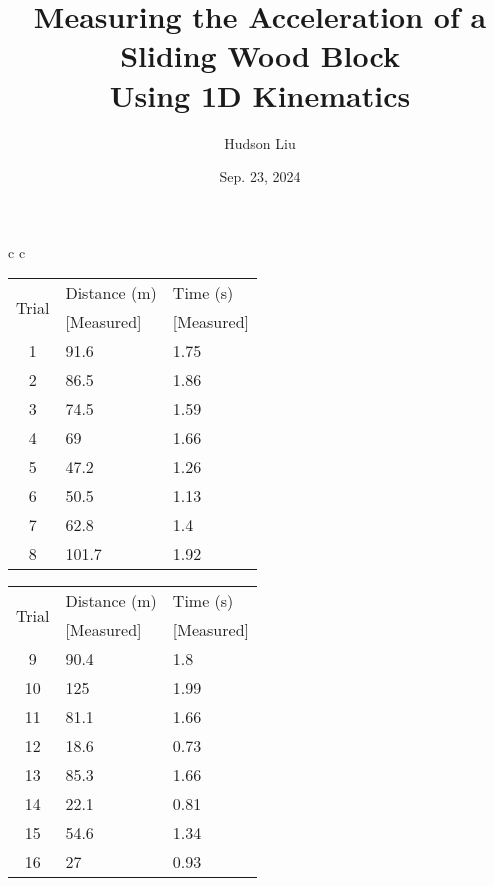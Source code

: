 \documentclass{article}
\title{Measuring the Acceleration of a Sliding Wood Block \protect\\ Using 1D Kinematics}
\author{Hudson Liu}
\date{Sep. 23, 2024}
\begin{document}
\maketitle

\def\arraystretch{1.2}%
\begin{center}
    \begin{tabular}{c c}
        \begin{tabular}{ | c l l | }
            \hline
            \multirow{2}{2em}{Trial} & Distance (m) & Time (s)\\
                                 & [Measured] & [Measured]\\
            \hline
            1 & 91.6  & 1.75\\
            2 & 86.5  & 1.86\\
            3 & 74.5  & 1.59\\
            4 & 69    & 1.66\\
            5 & 47.2  & 1.26\\
            6 & 50.5  & 1.13\\
            7 & 62.8  & 1.4\\
            8 & 101.7 &	1.92\\
            \hline
        \end{tabular}

        \begin{tabular}{ | c l l | }
            \hline
            \multirow{2}{2em}{Trial} & Distance (m) & Time (s)\\
                                 & [Measured] & [Measured]\\
            \hline
            9 & 90.4  & 1.8\\
            10 & 125  & 1.99\\
            11 & 81.1 & 1.66\\
            12 & 18.6 & 0.73\\
            13 & 85.3 & 1.66\\
            14 & 22.1 & 0.81\\
            15 & 54.6 & 1.34\\
            16 & 27   & 0.93\\
            \hline
        \end{tabular}
    \end{tabular}
\end{center}
\end{document}
